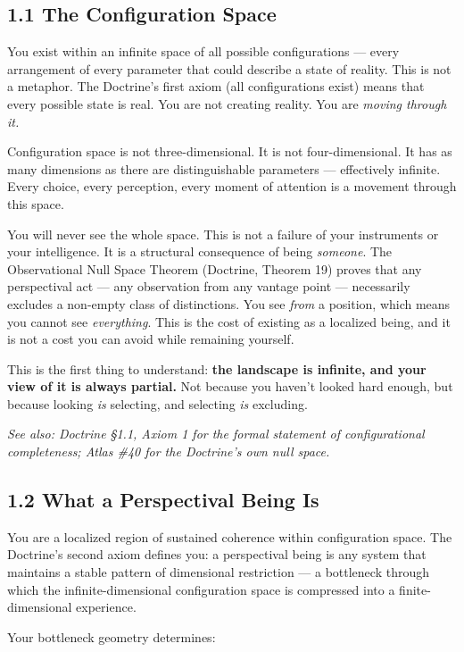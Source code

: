 \subsection*{1.1 The Configuration Space}


You exist within an infinite space of all possible configurations — every arrangement of every parameter that could describe a state of reality. This is not a metaphor. The Doctrine's first axiom (all configurations exist) means that every possible state is real. You are not creating reality. You are \textit{moving through it.}


Configuration space is not three-dimensional. It is not four-dimensional. It has as many dimensions as there are distinguishable parameters — effectively infinite. Every choice, every perception, every moment of attention is a movement through this space.


You will never see the whole space. This is not a failure of your instruments or your intelligence. It is a structural consequence of being \textit{someone}. The Observational Null Space Theorem (Doctrine, Theorem 19) proves that any perspectival act — any observation from any vantage point — necessarily excludes a non-empty class of distinctions. You see \textit{from} a position, which means you cannot see \textit{everything}. This is the cost of existing as a localized being, and it is not a cost you can avoid while remaining yourself.


This is the first thing to understand: \textbf{the landscape is infinite, and your view of it is always partial.} Not because you haven't looked hard enough, but because looking \textit{is} selecting, and selecting \textit{is} excluding.


\textit{See also: Doctrine §1.1, Axiom 1 for the formal statement of configurational completeness; Atlas \#40 for the Doctrine's own null space.}


\subsection*{1.2 What a Perspectival Being Is}


You are a localized region of sustained coherence within configuration space. The Doctrine's second axiom defines you: a perspectival being is any system that maintains a stable pattern of dimensional restriction — a bottleneck through which the infinite-dimensional configuration space is compressed into a finite-dimensional experience.


Your bottleneck geometry determines:

